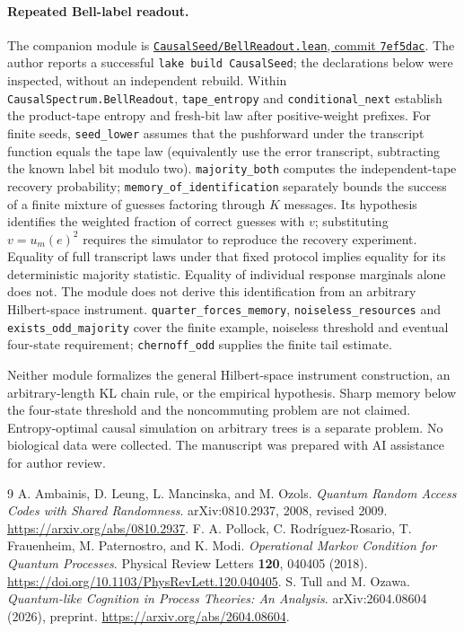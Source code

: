 \documentclass[11pt,a4paper]{article}
\theoremstyle{definition}
\begin{document}
\paragraph{Repeated Bell-label readout.}
The companion module is
\href{https://github.com/jendamikulik/finite-Shannon-theorem/blob/7ef5dac3d1d94530a0b33755449b6d9ff0ce806f/CausalSeed/BellReadout.lean}{\texttt{CausalSeed/BellReadout.lean}, commit \texttt{7ef5dac}}.
The author reports a successful \texttt{lake build CausalSeed}; the declarations below were inspected, without an independent rebuild.
Within \texttt{CausalSpectrum.BellReadout}, \texttt{tape\_entropy} and \texttt{conditional\_next} establish the product-tape entropy and fresh-bit law after positive-weight prefixes. For finite seeds, \texttt{seed\_lower} assumes that the pushforward under the transcript function equals the tape law (equivalently use the error transcript, subtracting the known label bit modulo two).
\texttt{majority\_both} computes the independent-tape recovery probability; \texttt{memory\_of\_identification} separately bounds the success of a finite mixture of guesses factoring through $K$ messages. Its hypothesis identifies the weighted fraction of correct guesses with $v$; substituting $v=u_m(e)^2$ requires the simulator to reproduce the recovery experiment. Equality of full transcript laws under that fixed protocol implies equality for its deterministic majority statistic. Equality of individual response marginals alone does not. The module does not derive this identification from an arbitrary Hilbert-space instrument.
\texttt{quarter\_forces\_memory}, \texttt{noiseless\_resources} and \texttt{exists\_odd\_majority} cover the finite example, noiseless threshold and eventual four-state requirement; \texttt{chernoff\_odd} supplies the finite tail estimate.

Neither module formalizes the general Hilbert-space instrument construction, an arbitrary-length KL chain rule, or the empirical hypothesis. Sharp memory below the four-state threshold and the noncommuting problem are not claimed. Entropy-optimal causal simulation on arbitrary trees is a separate problem. No biological data were collected. The manuscript was prepared with AI assistance for author review.

\begin{thebibliography}{9}
 A. Ambainis, D. Leung, L. Mancinska, and M. Ozols.
\emph{Quantum Random Access Codes with Shared Randomness}.
arXiv:0810.2937, 2008, revised 2009.
\url{https://arxiv.org/abs/0810.2937}.
 F. A. Pollock, C. Rodr\'{i}guez-Rosario, T. Frauenheim,
M. Paternostro, and K. Modi.
\emph{Operational Markov Condition for Quantum Processes}.
Physical Review Letters \textbf{120}, 040405 (2018).
\url{https://doi.org/10.1103/PhysRevLett.120.040405}.
 S. Tull and M. Ozawa.
\emph{Quantum-like Cognition in Process Theories: An Analysis}.
arXiv:2604.08604 (2026), preprint.
\url{https://arxiv.org/abs/2604.08604}.
\end{thebibliography}
\end{document}
